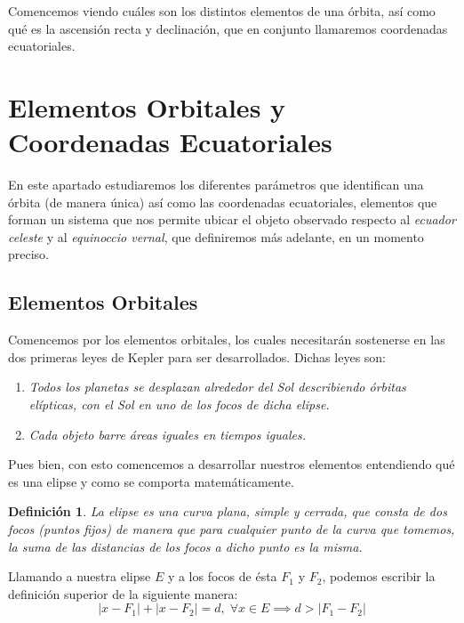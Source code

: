 \documentclass[11pt]{article}
\newtheorem{definition}[theorem]{Definición}
\begin{document}
Comencemos viendo cuáles son los distintos elementos de una órbita, así como qué es la ascensión recta y declinación, que en conjunto llamaremos coordenadas ecuatoriales.\\


\section{Elementos Orbitales y Coordenadas Ecuatoriales}
\label{sec:orbital_elements_equatorial_coordinates}
En este apartado estudiaremos los diferentes parámetros que identifican una órbita (de manera única) así como las coordenadas ecuatoriales, elementos que forman un sistema que nos permite ubicar el objeto observado respecto al \textit{ecuador celeste} y al \textit{equinoccio vernal}, que definiremos más adelante, en un momento preciso.\\

\subsection{Elementos Orbitales}
\label{subsec:orbital_elements}
Comencemos por los elementos orbitales, los cuales necesitarán sostenerse en las dos primeras leyes de Kepler para ser desarrollados. Dichas leyes son:

\begin{enumerate}
\item \textit{Todos los planetas se desplazan alrededor del Sol describiendo órbitas elípticas, con el Sol en uno de los focos de dicha elipse.}
\item \textit{Cada objeto barre áreas iguales en tiempos iguales.}
\end{enumerate}

Pues bien, con esto comencemos a desarrollar nuestros elementos entendiendo qué es una elipse y como se comporta matemáticamente.\\

\begin{definition}
La elipse es una curva plana, simple y cerrada, que consta de dos focos (puntos fijos) de manera que para cualquier punto de la curva que tomemos, la suma de las distancias de los focos a dicho punto es la misma.
\end{definition}

Llamando a nuestra elipse $E$ y a los focos de ésta $F_1$ y $F_2$, podemos escribir la definición superior de la siguiente manera:
\[
|x-F_1|+|x-F_2|=d, \; \forall x \in E \implies d>|F_1-F_2|
\]
\end{document}

